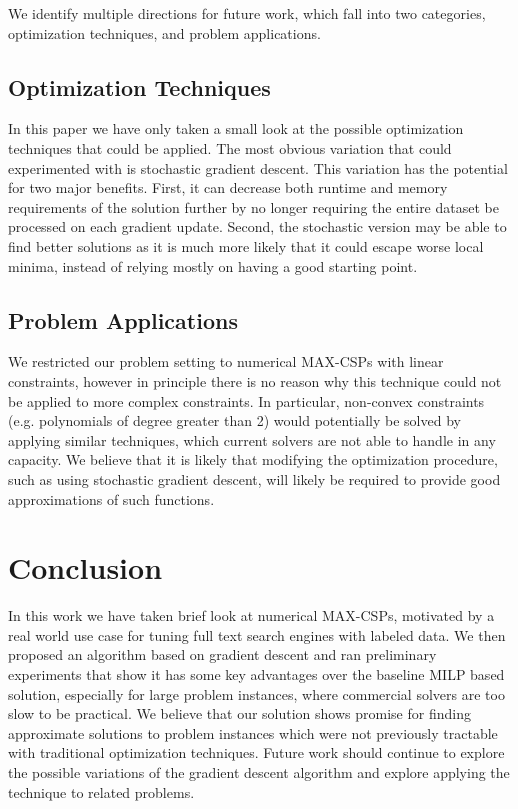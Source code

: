 \documentclass[a4paper]{article}
\begin{document}
We identify multiple directions for future work, which fall into 
two categories, optimization techniques, and problem applications. 

\subsection{Optimization Techniques}

In this paper we have only taken a small look at the possible optimization
techniques that could be applied. The most obvious variation that could experimented with
is stochastic gradient descent. This variation has the potential for two major
benefits. First, it can decrease both runtime and memory requirements
of the solution further by no longer requiring the entire dataset be processed
on each gradient update. Second, the stochastic version may be able to find
better solutions as it is much more likely that it could escape worse local
minima, instead of relying mostly on having a good starting point.


\subsection{Problem Applications}

We restricted our problem setting to numerical MAX-CSPs with linear
constraints, however in principle there is no reason why this technique could
not be applied to more complex constraints. In particular, non-convex constraints
(e.g. polynomials of degree greater than 2)
would potentially be solved by applying similar techniques, which current
solvers are not able to handle in any capacity. We believe that it is likely
that modifying the optimization procedure, such as using stochastic gradient
descent, will likely be required to provide good approximations of such
functions.

\section{Conclusion}

In this work we have taken brief look at numerical MAX-CSPs, motivated by a
real world use case for tuning full text search engines with labeled data. We
then proposed an algorithm based on gradient descent and ran preliminary
experiments that show it has some key advantages over the baseline MILP based
solution, especially for large problem instances, where commercial solvers are
too slow to be practical. We believe that our solution shows promise for
finding approximate solutions to problem instances which were not previously
tractable with traditional optimization techniques. Future work should continue
to explore the possible variations of the gradient descent algorithm and
explore applying the technique to related problems. 



\end{document}

